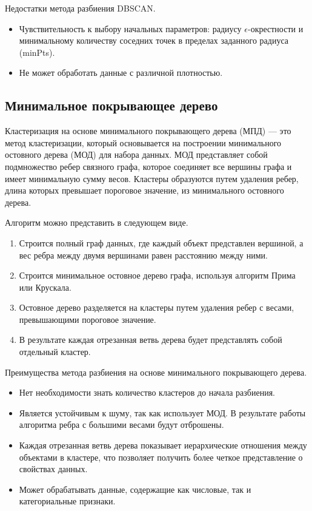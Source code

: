 Недостатки метода разбиения DBSCAN.

\begin{itemize}
    \item Чувствительность к выбору начальных параметров: радиусу $\epsilon$-окрестности и минимальному количеству соседних точек в пределах заданного радиуса (minPts).
    \item Не может обработать данные с различной плотностью.
\end{itemize}


\subsection{Минимальное покрывающее дерево}

Кластеризация на основе минимального покрывающего дерева \cite{AnalysisСlusteringAlgorithms} (МПД) --- это метод кластеризации, который основывается на построении минимального остовного дерева (МОД) \cite{MinimumSpanningTree} для набора данных. МОД представляет собой подмножество ребер связного графа, которое соединяет все вершины графа и имеет минимальную сумму весов. Кластеры образуются путем удаления ребер, длина которых превышает пороговое значение, из минимального остовного дерева.

Алгоритм можно представить в следующем виде.

\begin{enumerate}
    \item Строится полный граф данных, где каждый объект представлен вершиной, а вес ребра между двумя вершинами равен расстоянию между ними.
    \item Строится минимальное остовное дерево графа, используя алгоритм Прима или Крускала.
    \item Остовное дерево разделяется на кластеры путем удаления ребер с весами, превышающими пороговое значение.
    \item В результате каждая отрезанная ветвь дерева будет представлять собой отдельный кластер.
\end{enumerate}

Преимущества метода разбиения на основе минимального покрывающего дерева.

\begin{itemize}
    \item Нет необходимости знать количество кластеров до начала разбиения.
    \item Является устойчивым к шуму, так как использует МОД. В результате работы алгоритма ребра с большими весами будут отброшены.
    \item Каждая отрезанная ветвь дерева показывает иерархические отношения между объектами в кластере, что позволяет получить более четкое представление о свойствах данных.
    \item Может обрабатывать данные, содержащие как числовые, так и категориальные признаки.
\end{itemize}

